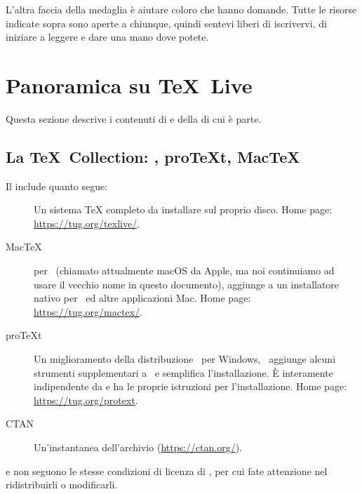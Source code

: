 \documentclass{article}
\begin{document}
L'altra faccia della medaglia è aiutare coloro che hanno domande. Tutte le
risorse indicate sopra sono aperte a chiunque, quindi sentevi liberi di
iscrivervi, di iniziare a leggere e dare una mano dove potete.

\section{Panoramica su \protect\TeX\protect\ Live}
\label{sec:overview-tl}

Questa sezione descrive i contenuti di \TL{} e della \TK{} di cui è parte.

\subsection{La \protect\TeX\protect\ Collection: \protect\TL,
            pro\protect\TeX{}t, Mac\protect\TeX}
\label{sec:tl-coll-dists}

Il \DVD{} \TK{} include quanto segue:

\begin{description}

\item [\TL] Un sistema \TeX{} completo da installare sul proprio disco. Home
  page: \url{https://tug.org/texlive/}.

\item [Mac\TeX] per \MacOSX\ (chiamato attualmente macOS da Apple, ma noi
  continuiamo ad usare il vecchio nome in questo documento), aggiunge a \TL{}
  un installatore nativo per \MacOSX\ ed altre applicazioni Mac. Home page:
  \url{https://tug.org/mactex/}.

\item [pro\TeX{}t] Un miglioramento della distribuzione \MIKTEX\ per
  Windows, \ProTeXt\ aggiunge alcuni strumenti supplementari a \MIKTEX\ e
  semplifica l'installazione. È interamente indipendente da \TL{} e ha le
  proprie istruzioni per l'installazione. Home page:
  \url{https://tug.org/protext}.  

\item [CTAN] Un'instantanea dell'archivio \CTAN{}
  (\url{https://ctan.org/}).

\end{description}

\CTAN{} e  non seguono le stesse condizioni di licenza di
\TL{}, per cui fate attenzione nel ridistribuirli o modificarli.
\end{document}
